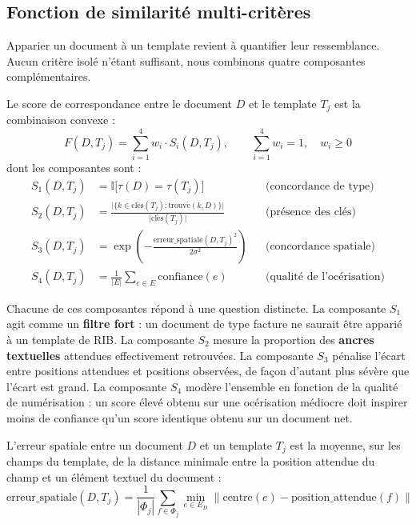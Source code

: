 \subsection{Fonction de similarité multi-critères}
\label{subsec:similarite}

Apparier un document à un template revient à quantifier leur ressemblance. Aucun critère
isolé n'étant suffisant, nous combinons quatre composantes complémentaires.

\begin{definition}
\label{def:score-correspondance}
Le score de correspondance entre le document $D$ et le template $T_j$ est la combinaison
convexe :
\begin{equation}
F(D, T_j) = \sum_{i=1}^{4} w_i \cdot S_i(D, T_j),
\qquad \sum_{i=1}^{4} w_i = 1,\quad w_i \geq 0
\end{equation}
dont les composantes sont :
\begin{align}
S_1(D, T_j) &= \mathbb{I}\big[\tau(D) = \tau(T_j)\big] &&\text{(concordance de type)}\\
S_2(D, T_j) &= \frac{\big|\{k \in \mathrm{cl\acute{e}s}(T_j) : \mathrm{trouv\acute{e}}(k, D)\}\big|}{\big|\mathrm{cl\acute{e}s}(T_j)\big|} &&\text{(présence des clés)}\\
S_3(D, T_j) &= \exp\!\left(-\frac{\mathrm{erreur\_spatiale}(D, T_j)^2}{2\sigma^2}\right) &&\text{(concordance spatiale)}\\
S_4(D, T_j) &= \frac{1}{|E|}\sum_{e \in E} \mathrm{confiance}(e) &&\text{(qualité de l'océrisation)}
\end{align}
\end{definition}

Chacune de ces composantes répond à une question distincte. La composante $S_1$ agit comme
un \textbf{filtre fort} : un document de type facture ne saurait être apparié à un template
de RIB. La composante $S_2$ mesure la proportion des \textbf{ancres textuelles} attendues
effectivement retrouvées. La composante $S_3$ pénalise l'écart entre positions attendues et
positions observées, de façon d'autant plus sévère que l'écart est grand. La composante
$S_4$ modère l'ensemble en fonction de la qualité de numérisation : un score élevé obtenu
sur une océrisation médiocre doit inspirer moins de confiance qu'un score identique obtenu
sur un document net.

\begin{definition}
\label{def:erreur-spatiale}
L'erreur spatiale entre un document $D$ et un template $T_j$ est la moyenne, sur les champs
du template, de la distance minimale entre la position attendue du champ et un élément
textuel du document :
\begin{equation}
\mathrm{erreur\_spatiale}(D, T_j) = \frac{1}{|\Phi_j|}\sum_{f \in \Phi_j}
\min_{e \in E_D} \big\lVert \mathrm{centre}(e) - \mathrm{position\_attendue}(f) \big\rVert
\end{equation}
\end{definition}

